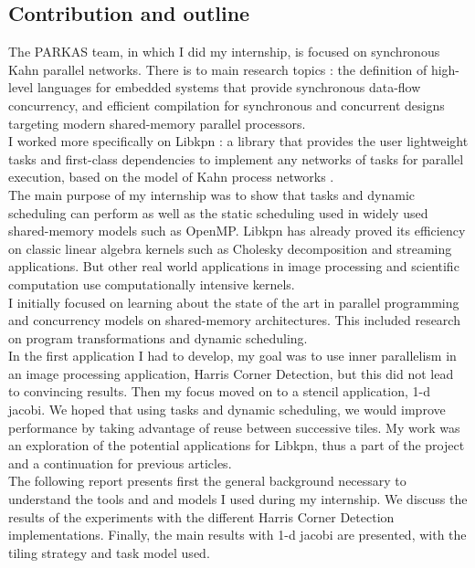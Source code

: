 \documentclass[a4paper,11pt]{article}
\begin{document}
\subsection{Contribution and outline}
The PARKAS team, in which I did my internship, is focused on synchronous Kahn parallel networks. There 
is to main research topics : the definition of high-level languages for embedded systems that provide
synchronous data-flow concurrency, and efficient compilation for synchronous and concurrent designs 
targeting modern shared-memory parallel processors. \\
I worked more specifically on Libkpn : a library that provides the user lightweight tasks and
first-class dependencies to implement any networks of tasks for parallel execution, based
on the model of Kahn process networks \cite{kahn_semantics_1974}.\\
The main purpose of my internship was to show that tasks and dynamic scheduling can
perform as well as the static scheduling used in widely used shared-memory models such
as OpenMP. Libkpn has already proved its efficiency on classic linear algebra kernels such
as Cholesky decomposition and streaming applications. But other real world applications
in image processing and scientific computation use computationally intensive kernels. \\
I initially focused on learning about the state of the art in parallel programming and concurrency
models on shared-memory architectures. This included research on program transformations and dynamic
scheduling. \\
In the first application I had to develop, my goal was to use inner parallelism in an image processing
application, Harris Corner Detection, but this did not lead to convincing results. Then my focus moved 
on to a stencil application, 1-d jacobi. We hoped that using tasks and dynamic scheduling, we would 
improve performance by taking advantage of reuse between successive tiles. My work was an exploration
of the potential applications for Libkpn, thus a part of the project and a continuation for previous 
articles.\\
\vspace{1cm}
The following report presents first the general background necessary to understand the tools and and models
I used during my internship. We discuss the results of the experiments with the different Harris Corner
Detection implementations. Finally, the main results with 1-d jacobi are presented, with the tiling 
strategy and task model used.
\end{document}
